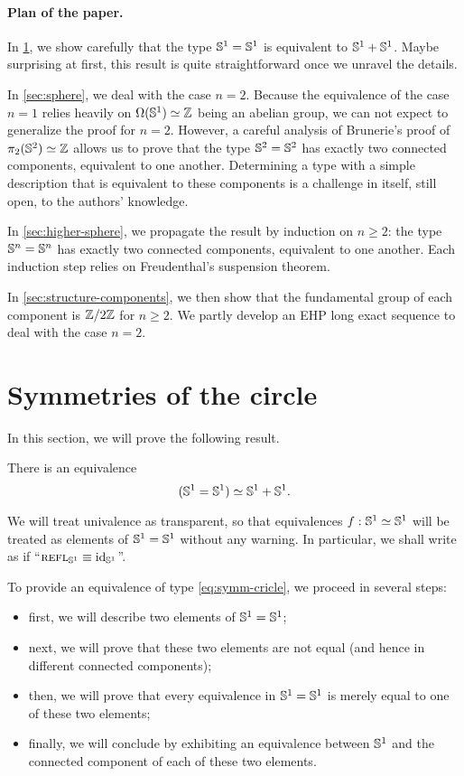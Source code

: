 \documentclass[english,a4paper]{lmcs}
\begin{document}
\paragraph{Plan of the paper.}%
In \cref{sec:circle-case}, we show carefully that the type ${{\mathbb S^{1}}} = {{\mathbb S^{1}}}$
is equivalent to ${{\mathbb S^{1}}} + {{\mathbb S^{1}}}$. Maybe surprising at first, this result
is quite straightforward once we unravel the details.

In \cref{sec:sphere}, we deal with the case $n=2$. Because the
equivalence of the case $n=1$ relies heavily on $\Omega({{\mathbb S^{1}}})\simeq \mathbb{Z}$
being an abelian group, we can not expect to generalize the proof for
$n=2$. However, a careful analysis of Brunerie's proof of
$\pi_2({{\mathbb S^{2}}}) \simeq \mathbb{Z}$ allows us to prove that the type ${{\mathbb S^{2}}}={{\mathbb S^{2}}}$ has
exactly two connected components, equivalent to one another.
Determining a type with a simple description that is
equivalent to these components is a challenge in itself, still open,
to the authors' knowledge.

In \cref{sec:higher-sphere}, we propagate the result by induction on
$n\geq 2$: the type ${\mathbb S^{n}} = {\mathbb S^{n}}$ has exactly two connected
components, equivalent to one another. Each induction step relies on
Freudenthal's suspension theorem.

In \cref{sec:structure-components}, we then show that the fundamental group of each component is $\mathbb{Z}/2\mathbb{Z}$ for $n\ge2$.
We partly develop an EHP long exact sequence to deal with the case $n=2$.

\section{Symmetries of the circle}
\label{sec:circle-case}%

In this section, we will prove the following result.
\begin{thm}
  \label{thm:symmetries-of-S1}
  There is an equivalence
  \begin{equation}
    \label{eq:symm-cricle}%
    (\Sc = \Sc) \weq \Sc+\Sc.
  \end{equation}
\end{thm}
We will treat univalence as transparent, so that equivalences
$f:{{\mathbb S^{1}}}\simeq {{\mathbb S^{1}}}$ will be treated as elements of ${{\mathbb S^{1}}}={{\mathbb S^{1}}}$ without any
warning. In particular, we shall write as if
``$\mathop{{\textsc{refl}}_{{{\mathbb S^{1}}}}} \equiv \mathord{\mathrm{id}}_{{\mathbb S^{1}}}$''.

To provide an equivalence of type \cref{eq:symm-cricle}, we proceed
in several steps:
\begin{itemize}
\item first, we will describe two elements of ${{\mathbb S^{1}}}={{\mathbb S^{1}}}$;
\item next, we will prove that these two elements are not equal (and
hence in different connected components);
\item then, we will prove that every equivalence in ${{\mathbb S^{1}}}={{\mathbb S^{1}}}$ is
  merely equal to one of these two elements;
\item finally, we will conclude by exhibiting an equivalence between
  ${{\mathbb S^{1}}}$ and the connected component of each of these two elements.
\end{itemize}
\end{document}
